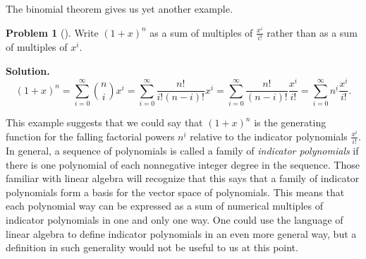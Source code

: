 \documentclass[10pt,]{book}
\theoremstyle{plain}
\theoremstyle{definition}
\newtheorem{activity}[project]{Problem}
\theoremstyle{definition}
\numberwithin{equation}{chapter}
\begin{document}
\par
The binomial theorem gives us yet another example.%
\begin{activity}[]\label{activity-371}
Write \((1+x)^n\) as a sum of multiples of \(\frac{x^i}{i!}\) rather than as a sum of multiples of \(x^i\).%
\par\medskip\noindent%
\textbf{Solution.}\quad %
\begin{equation*}
(1+x)^n =
\sum_{i=0}^\infty \binom{n}{i}x^i=\sum_{i=0}^\infty \frac{n!}{i!(n-i)!}x^i
=
\sum_{i=0}^\infty \frac{n!}{(n-i)!}\frac{x^i}{i!} = \sum_{i=0}^\infty
n^{\underline{i}} \frac{x^i}{i!}.
\end{equation*}
%
\end{activity}
This example suggests that we could say that \((1+x)^n\) is the generating function for the falling factorial powers \(n^{\underline{i}}\) relative to the indicator polynomials \(\frac{x^i}{i!}\). In general, a sequence of polynomials is called a family of \emph{indicator polynomials} if there is one polynomial of each nonnegative integer degree in the sequence. Those familiar with linear algebra will recognize that this says that a family of indicator polynomials form a basis for the vector space of polynomials. This means that each polynomial way can be expressed as a sum of numerical multiples of indicator polynomials in one and only one way. One could use the language of linear algebra to define indicator polynomials in an even more general way, but a definition in such generality would not be useful to us at this point.%
\typeout{************************************************}
\typeout{************************************************}
\end{document}
